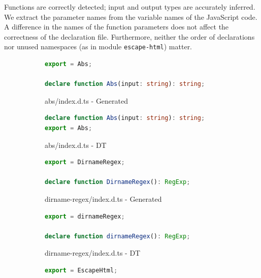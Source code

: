 \documentclass[sigconf]{acmart}
\begin{document}
Functions are correctly detected; input and output types are
accurately inferred. 
We extract the parameter names from the variable names of the JavaScript
code.
A difference in the names of the function parameters does not affect the correctness of
the declaration file.
Furthermore, neither the order of declarations nor unused namespaces
(as in module \texttt{escape-html}) matter.

 
\begin{figure}[tp]
    \centering
    \begin{subfigure}[t]{0.48\linewidth}
      \begin{lstlisting}[language=TypeScript,numbers=none]
export = Abs;

declare function Abs(input: string): string;
      \end{lstlisting}
      \caption{abs/index.d.ts - Generated}
    \end{subfigure}
    \hfill
    \begin{subfigure}[t]{0.48\linewidth}
      \begin{lstlisting}[language=TypeScript,numbers=none]
declare function Abs(input: string): string;
export = Abs;
      \end{lstlisting}
      \caption{abs/index.d.ts - DT}
    \end{subfigure}


    \begin{subfigure}[t]{0.48\linewidth}
        \begin{lstlisting}[language=TypeScript,numbers=none]
export = DirnameRegex;

declare function DirnameRegex(): RegExp;
        \end{lstlisting}
        \caption{dirname-regex/index.d.ts - Generated}
      \end{subfigure}
      \hfill
      \begin{subfigure}[t]{0.48\linewidth}
        \begin{lstlisting}[language=TypeScript,numbers=none]
export = dirnameRegex;

declare function dirnameRegex(): RegExp;
        \end{lstlisting}
        \caption{dirname-regex/index.d.ts - DT}
      \end{subfigure}


      \begin{subfigure}[t]{0.48\linewidth}
        \begin{lstlisting}[language=TypeScript,numbers=none]
export = EscapeHtml;


\end{lstlisting}
\end{subfigure}
\end{figure}
\end{document}
